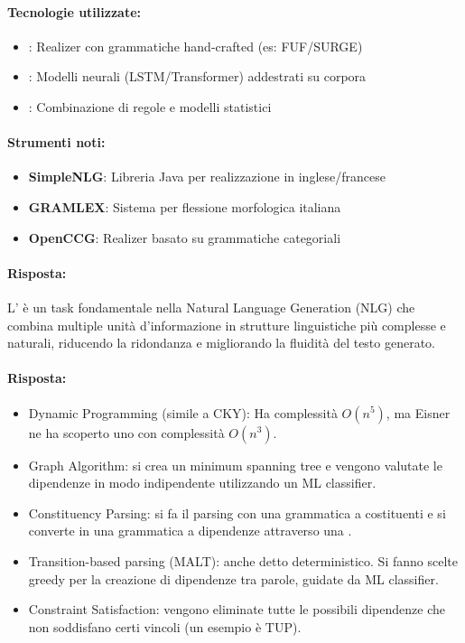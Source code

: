 \paragraph{Tecnologie utilizzate:}
\begin{itemize}
  \item {}: Realizer con grammatiche hand-crafted (es: FUF/SURGE)
  \item {}: Modelli neurali (LSTM/Transformer) addestrati su corpora
  \item {}: Combinazione di regole e modelli statistici
\end{itemize}

\paragraph{Strumenti noti:}
\begin{itemize}
  \item \textbf{SimpleNLG}: Libreria Java per realizzazione in inglese/francese
  \item \textbf{GRAMLEX}: Sistema per flessione morfologica italiana
  \item \textbf{OpenCCG}: Realizer basato su grammatiche categoriali
\end{itemize}


\paragraph{Risposta:} L' è un task fondamentale nella Natural Language Generation (NLG) che combina multiple unità d'informazione in strutture linguistiche più complesse e naturali, riducendo la ridondanza e migliorando la fluidità del testo generato.


\paragraph{Risposta:}

\begin{itemize}
  \item Dynamic Programming (simile a CKY): Ha complessità $O(n^5)$, ma Eisner ne ha scoperto uno con complessità $O(n^3)$. 
  \item Graph Algorithm: si crea un minimum spanning tree e vengono valutate le dipendenze in modo indipendente utilizzando un ML classifier. 
  \item Constituency Parsing: si fa il parsing con una grammatica a costituenti e si converte in una grammatica a dipendenze attraverso una .
  \item Transition-based parsing (MALT): anche detto deterministico. Si fanno scelte greedy per la creazione di dipendenze tra parole, guidate da ML classifier.
  \item Constraint Satisfaction: vengono eliminate tutte le possibili dipendenze che non soddisfano certi vincoli (un esempio è TUP).
\end{itemize}

